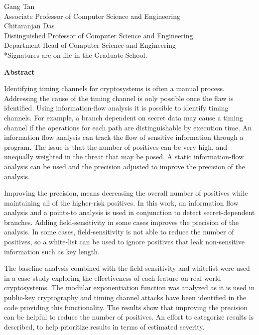 \documentclass{report}
\begin{document}
\vspace{2.5cm}
\noindent
Gang Tan\\
Associate Professor of Computer Science and Engineering\\

\vspace{2.5cm}
\noindent
Chitaranjan Das\\
Distinguished Professor of Computer Science and Engineering\\
Department Head of Computer Science and Engineering\\

\vspace{2.5cm}
\noindent
*Signatures are on file in the Graduate School.\\

\clearpage

\begin{center}\large\textbf{Abstract}
  \end{center}

Identifying timing channels for cryptosystems is often a manual process.
Addressing the cause of the timing channel is only possible once the flaw is
identified. Using information-flow analysis it is possible to identify timing
channels. For example, a branch dependent on secret data may cause a timing
channel if the operations for each path are distinguishable by execution time.
An information flow analysis can track the flow of sensitive information
through a program. The issue is that the number of positives can be very high,
and unequally weighted in the threat that may be posed. A static
information-flow analysis can be used and the precision adjusted to improve
the precision of the analysis.

Improving the precision, means decreasing the overall number of positives while
maintaining all of the higher-risk positives. In this work, an
information flow analysis and a points-to analysis is used in conjunction to
detect secret-dependent branches. Adding field-sensitivity in some cases
improves the precision of the analysis. In some cases, field-sensitivity is not
able to reduce the number of positives, so a white-list can be used to ignore
positives that leak non-sensitive information such as key length.

The baseline analysis combined with the field-sensitivity and whitelist were
used in a case study exploring the effectiveness of each feature on real-world
cryptosystems. The modular exponentiation function was analyzed as it is used
in public-key cryptography and timing channel attacks have been identified in the
code providing this functionality. The results show that improving the precision
can be helpful to reduce the number of positives. An effort to categorize
results is described, to help prioritize results in terms of estimated severity.
\end{document}
